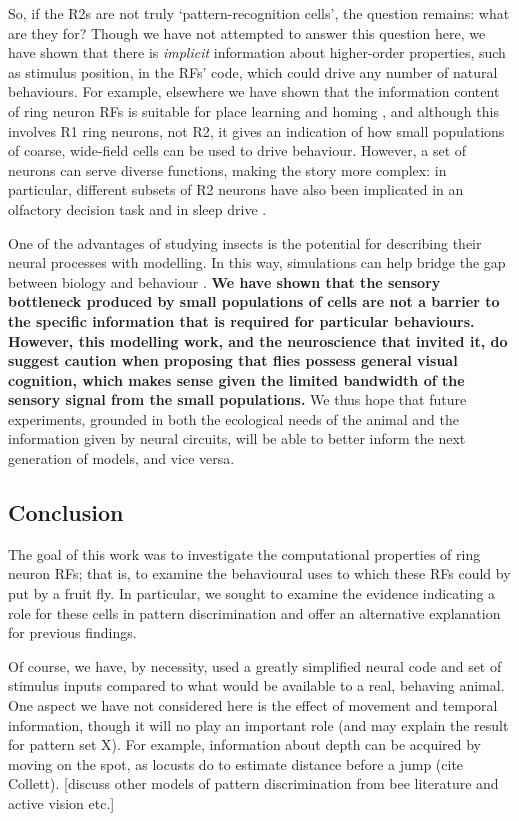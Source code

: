 So, if the R2s are not truly `pattern-recognition cells', the question remains: what are they for?
Though we have not attempted to answer this question here, we have shown that there is \emph{implicit} information about higher-order properties, such as stimulus position, in the \acp{RF}' code, which could drive any number of natural behaviours.
For example, elsewhere we have shown that the information content of ring neuron \acp{RF} is suitable for place learning and homing \cite{Dewar2015}, and although this involves R1 ring neurons, not R2, it gives an indication of how small populations of coarse, wide-field cells can be used to drive behaviour.
However, a set of neurons can serve diverse functions, making the story more complex: in particular, different subsets of R2 neurons have also been implicated in an olfactory decision task \cite{Azanchi2013} and in sleep drive \cite{Liu2016}.

One of the advantages of studying insects is the potential for describing their neural processes with modelling.
In this way, simulations can help bridge the gap between biology and behaviour \cite{Webb2009}.
\textbf{
We have shown that the sensory bottleneck produced by small populations of cells are not a barrier to the specific information that is required for particular behaviours.
However, this modelling work, and the neuroscience that invited it, do suggest caution when proposing that flies possess general visual cognition, which makes sense given the limited bandwidth of the sensory signal from the small populations.
}
We thus hope that future experiments, grounded in both the ecological needs of the animal and the information given by neural circuits, will be able to better inform the next generation of models, and vice versa.

\subsection*{Conclusion}
The goal of this work was to investigate the computational properties of ring neuron RFs; that is, to examine the behavioural uses to which these RFs could by put by a fruit fly.
In particular, we sought to examine the evidence indicating a role for these cells in pattern discrimination and offer an alternative explanation for previous findings.

Of course, we have, by necessity, used a greatly simplified neural code and set of stimulus inputs compared to what would be available to a real, behaving animal.
One aspect we have not considered here is the effect of movement and temporal information, though it will no play an important role (and may explain the result for pattern set X).
For example, information about depth can be acquired by moving on the spot, as locusts do to estimate distance before a jump (cite Collett).
[discuss other models of pattern discrimination from bee literature and active vision etc.]

